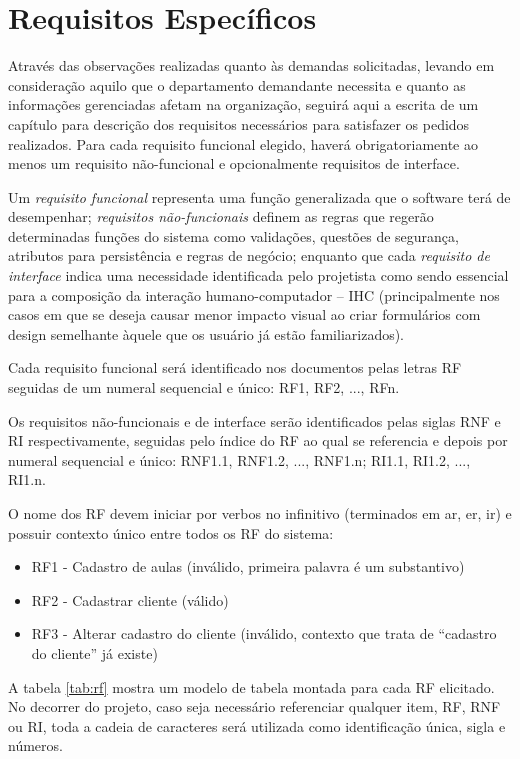 \documentclass[12pt,openright,a4paper,brazil]{abntex2}
\begin{document}
\chapter{Requisitos Específicos}

Através das observações realizadas quanto às demandas solicitadas, levando em consideração aquilo que o departamento demandante necessita e quanto as informações gerenciadas afetam na organização, seguirá aqui a escrita de um capítulo para descrição dos requisitos necessários para satisfazer os pedidos realizados. Para cada requisito funcional elegido, haverá obrigatoriamente ao menos um requisito não-funcional e opcionalmente requisitos de interface. 

Um \emph{requisito funcional} representa uma função generalizada que o software terá de desempenhar; \emph{requisitos não-funcionais} definem as regras que regerão determinadas funções do sistema como validações, questões de segurança, atributos para persistência e regras de negócio; enquanto que cada \emph{requisito de interface} indica uma necessidade identificada pelo projetista como sendo essencial para a composição da interação humano-computador -- IHC (principalmente nos casos em que se deseja causar menor impacto visual ao criar formulários com design semelhante àquele que os usuário já estão familiarizados).

Cada requisito funcional será identificado nos documentos pelas letras RF seguidas de um numeral sequencial e único: RF1, RF2, ..., RFn.

Os requisitos não-funcionais e de interface serão identificados pelas siglas RNF e RI respectivamente, seguidas pelo índice do RF ao qual se referencia e depois por numeral sequencial e único: RNF1.1, RNF1.2, ..., RNF1.n; RI1.1, RI1.2, ..., RI1.n. 

O nome dos RF devem iniciar por verbos no infinitivo (terminados em ar, er, ir) e possuir contexto único entre todos os RF do sistema:

\begin{itemize}
	\item RF1 - Cadastro de aulas (inválido, primeira palavra é um substantivo)
	\item RF2 - Cadastrar cliente (válido)
	\item RF3 - Alterar cadastro do cliente (inválido, contexto que trata de ``cadastro do cliente'' já existe)
\end{itemize}

A tabela \ref{tab:rf} mostra um modelo de tabela montada para cada RF elicitado. No decorrer do projeto, caso seja necessário referenciar qualquer item, RF, RNF ou RI, toda a cadeia de caracteres será utilizada como identificação única, sigla e números.
\end{document}
